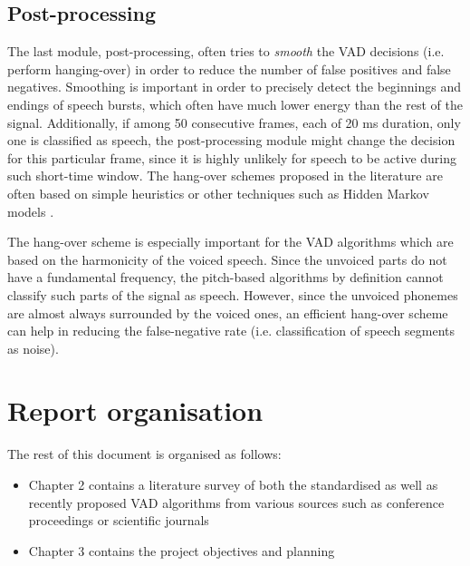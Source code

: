 \subsection{Post-processing}

The last module, post-processing, often tries to \emph{smooth} the VAD decisions (i.e. perform hanging-over) in order to reduce the number of false positives and false negatives. Smoothing is important in order to precisely detect the beginnings and endings of speech bursts, which often have much lower energy than the rest of the signal. Additionally, if among 50 consecutive frames, each of 20 ms duration, only one is classified as speech, the post-processing module might change the decision for this particular frame, since it is highly unlikely for speech to be active during such short-time window. The hang-over schemes  proposed in the literature are often based on simple heuristics \cite{G729} or other techniques such as Hidden Markov models \cite{Sohn}.

The hang-over scheme is especially important for the VAD algorithms which are based on the harmonicity of the voiced speech. Since the unvoiced parts do not have a fundamental frequency, the pitch-based algorithms by definition cannot classify such parts of the signal as speech. However, since the unvoiced phonemes are almost always surrounded by the voiced ones, an efficient hang-over scheme can help in reducing the false-negative rate (i.e. classification of speech segments as noise).


\section{Report organisation}

The rest of this document is organised as follows:
\begin{itemize}
\item Chapter 2 contains a literature survey of both the standardised as well as recently proposed VAD algorithms from various sources such as conference proceedings or scientific journals
\item Chapter 3 contains the project objectives and planning
\end{itemize}
